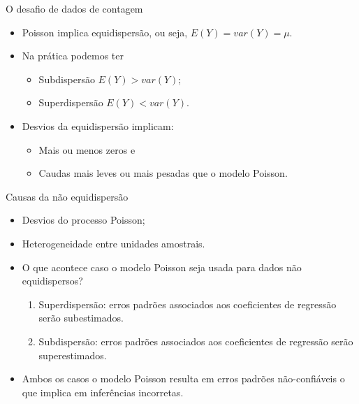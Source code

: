 \documentclass[10pt, aspectratio=169]{beamer}\usepackage[]{graphicx}\usepackage[]{color}
\begin{document}
\begin{frame}{O desafio de dados de contagem}
\begin{itemize}
\item Poisson implica equidispersão, ou seja, $ E(Y) = var(Y) = \mu. $
\vspace{0,5cm}
\item Na prática podemos ter
\begin{itemize}
  \item Subdispersão $E(Y) > var(Y)$;
  \item Superdispersão $E(Y) < var(Y)$.
\end{itemize}
\vspace{0,5cm}
  \item Desvios da equidispersão implicam: 
  \begin{itemize}
    \item Mais ou menos zeros e
    \item Caudas mais leves ou mais pesadas que o modelo Poisson.
  \end{itemize}
\end{itemize}
\end{frame}

\begin{frame}{Causas da não equidispersão}
\begin{itemize}
\item Desvios do processo Poisson;
\item Heterogeneidade entre unidades amostrais.
\vspace{0,5cm}
\item O que acontece caso o modelo Poisson seja usada para dados não equidispersos?
\begin{enumerate}
  \item Superdispersão: erros padrões associados aos coeficientes de 
  regressão serão subestimados.
  \item Subdispersão: erros padrões associados aos coeficientes de 
  regressão serão superestimados.
\end{enumerate}
\vspace{0,5cm}
  \item Ambos os casos o modelo Poisson resulta em erros padrões 
  não-confiáveis o que implica em inferências incorretas.
\end{itemize}
\end{frame}
\end{document}
